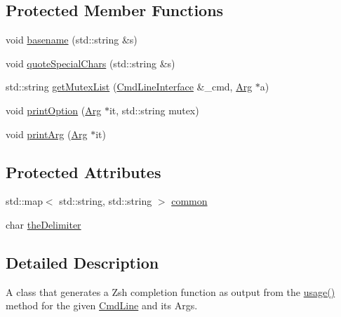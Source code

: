 \subsection*{Protected Member Functions}
\begin{DoxyCompactItemize}
\item 
void \hyperlink{class_t_c_l_a_p_1_1_zsh_completion_output_a3fff80665ab8d6161de6451924c2b954}{basename} (std\+::string \&s)
\item 
void \hyperlink{class_t_c_l_a_p_1_1_zsh_completion_output_aacd678921212eb6654d7f704da360361}{quote\+Special\+Chars} (std\+::string \&s)
\item 
std\+::string \hyperlink{class_t_c_l_a_p_1_1_zsh_completion_output_af3fceb65fc2c22ae8cc3c1df8a503184}{get\+Mutex\+List} (\hyperlink{class_t_c_l_a_p_1_1_cmd_line_interface}{Cmd\+Line\+Interface} \&\+\_\+cmd, \hyperlink{class_t_c_l_a_p_1_1_arg}{Arg} $\ast$a)
\item 
void \hyperlink{class_t_c_l_a_p_1_1_zsh_completion_output_a33903e3aef02f50799726eb7789fb4d4}{print\+Option} (\hyperlink{class_t_c_l_a_p_1_1_arg}{Arg} $\ast$it, std\+::string mutex)
\item 
void \hyperlink{class_t_c_l_a_p_1_1_zsh_completion_output_a1d079ecf271977419432fb0caa72d035}{print\+Arg} (\hyperlink{class_t_c_l_a_p_1_1_arg}{Arg} $\ast$it)
\end{DoxyCompactItemize}
\subsection*{Protected Attributes}
\begin{DoxyCompactItemize}
\item 
std\+::map$<$ std\+::string, std\+::string $>$ \hyperlink{class_t_c_l_a_p_1_1_zsh_completion_output_aaa1f1d51a31c32ca28df97c951aaad81}{common}
\item 
char \hyperlink{class_t_c_l_a_p_1_1_zsh_completion_output_a170dd4ecb233984f3e2b6f853c82b1b0}{the\+Delimiter}
\end{DoxyCompactItemize}


\subsection{Detailed Description}
A class that generates a Zsh completion function as output from the \hyperlink{class_t_c_l_a_p_1_1_zsh_completion_output_a3ea685b174fce7ddf2353129863b49d7}{usage()} method for the given \hyperlink{class_t_c_l_a_p_1_1_cmd_line}{Cmd\+Line} and its Args. 

